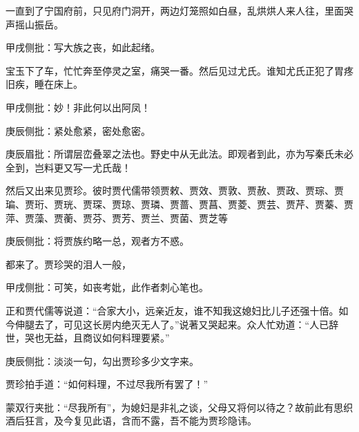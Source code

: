 \begin{parag}
    一直到了宁国府前，只见府门洞开，两边灯笼照如白昼，乱烘烘人来人往，里面哭声摇山振岳。\begin{note}甲戌侧批：写大族之丧，如此起绪。\end{note}宝玉下了车，忙忙奔至停灵之室，痛哭一番。然后见过尤氏。谁知尤氏正犯了胃疼旧疾，睡在床上。\begin{note}甲戌侧批：妙！非此何以出阿凤！\end{note}\begin{note}庚辰侧批：紧处愈紧，密处愈密。\end{note}\begin{note}庚辰眉批：所谓层峦叠翠之法也。野史中从无此法。即观者到此，亦为写秦氏未必全到，岂料更又写一尤氏哉！\end{note}然后又出来见贾珍。彼时贾代儒带领贾敕、贾效、贾敦、贾赦、贾政、贾琮、贾㻞、贾珩、贾珖、贾琛、贾琼、贾璘、贾蔷、贾菖、贾菱、贾芸、贾芹、贾蓁、贾萍、贾藻、贾蘅、贾芬、贾芳、贾兰、贾菌、贾芝等\begin{note}庚辰侧批：将贾族约略一总，观者方不惑。\end{note}都来了。贾珍哭的泪人一般，\begin{note}甲戌侧批：可笑，如丧考妣，此作者刺心笔也。\end{note}正和贾代儒等说道：“合家大小，远亲近友，谁不知我这媳妇比儿子还强十倍。如今伸腿去了，可见这长房内绝灭无人了。”说著又哭起来。众人忙劝道：“人已辞世，哭也无益，且商议如何料理要紧。”\begin{note}庚辰侧批：淡淡一句，勾出贾珍多少文字来。\end{note}贾珍拍手道：“如何料理，不过尽我所有罢了！”\begin{note}蒙双行夹批：“尽我所有”，为媳妇是非礼之谈，父母又将何以待之？故前此有思织酒后狂言，及今复见此语，含而不露，吾不能为贾珍隐讳。\end{note}
\end{parag}


